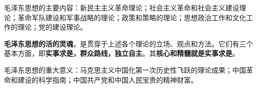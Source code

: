 {毛泽东思想的主要内容}：新民主主义革命理论；社会主义革命和社会主义建设理论；革命军队建设和军事战略的理论；政策和策略的理论；思想政治工作和文化工作的理论；党的建设理论。

\textbf{{毛泽东思想的}{活的灵魂}}，是贯穿于上述各个理论的立场、观点和方法。它们有三个基本方面，即\textbf{{实事求是，群众路线，独立自主}}。其\textbf{{核心和精髓就是实事求是}}。

{毛泽东思想的重大意义}{：马克思主义中国化第一次历史性飞跃的理论成果；中国革命和建设的科学指南；中国共产党和中国人民宝贵的精神财富。}
